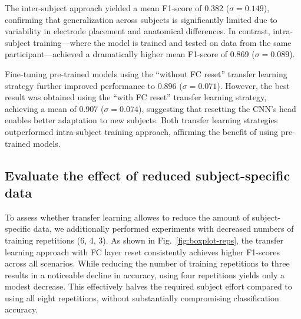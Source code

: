 \begin{multicols}{2}
The inter-subject approach yielded a mean F1-score of 0.382 ($\sigma = 0.149$), confirming that generalization across subjects is significantly limited due to variability in electrode placement and anatomical differences. In contrast, intra-subject training—where the model is trained and tested on data from the same participant—achieved a dramatically higher mean F1-score of 0.869 ($\sigma = 0.089$).

Fine-tuning pre-trained models using the ``without FC reset'' transfer learning strategy further improved performance to 0.896 ($\sigma = 0.071$). However, the best result was obtained using the ``with FC reset'' transfer learning strategy, achieving a mean of 0.907 ($\sigma = 0.074$), suggesting that resetting the CNN's head enables better adaptation to new subjects. Both transfer learning strategies outperformed intra-subject training approach, affirming the benefit of using pre-trained models.

\subsection*{Evaluate the effect of reduced subject-specific data}

To assess whether transfer learning allowes to reduce the amount of subject-specific data, we additionally performed experiments with decreased numbers of training repetitions (6, 4, 3). As shown in Fig.~\ref{fig:boxplot-reps}, the transfer learning approach with FC layer reset consistently achieves higher F1-scores across all scenarios. While reducing the number of training repetitions to three results in a noticeable decline in accuracy, using four repetitions yields only a modest decrease. This effectively halves the required subject effort compared to using all eight repetitions, without substantially compromising classification accuracy.

\end{multicols}

